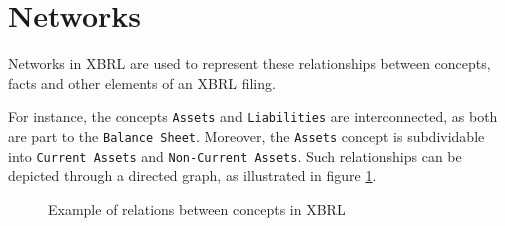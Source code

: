\section{Networks}
\label{sec:xbrl_networks}





Networks in XBRL are used to represent these relationships between concepts, facts and other elements of an XBRL filing.

For instance, the concepts \texttt{Assets} and \texttt{Liabilities} are interconnected, as both are part to the \texttt{Balance Sheet}.
Moreover, the \texttt{Assets} concept is subdividable into \texttt{Current Assets} and \texttt{Non-Current Assets}.
Such relationships can be depicted through a directed graph, as illustrated in figure \ref{fig:example_visualization_network_xbrl}.

\begin{figure}[H]
    \caption{Example of relations between concepts in XBRL}
    \label{fig:example_visualization_network_xbrl}
\end{figure}


